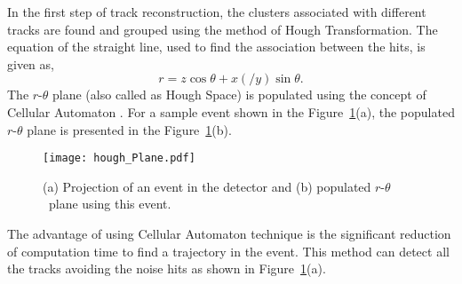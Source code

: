 In the first step of track reconstruction, the clusters associated
with different tracks are found and grouped using the method of Hough
Transformation\cite{hought1,hought}. The equation of the straight line,
used to find the association between the hits, is given as,
\begin{equation}
  r=z\cos\theta+x\left(/y\right)\sin\theta. \label{eq:hough}
\end{equation}
The \mbox{$r$-$\theta$} plane (also called as Hough Space) is
populated using the concept of Cellular Automaton \cite{cellular}.
For a sample event shown in the Figure~\ref{fig:houghPl}(a),
the populated \mbox{$r$-$\theta$} plane is presented in the
Figure~\ref{fig:houghPl}(b).
\begin{figure}[h]
  \texttt{[image: hough\_Plane.pdf]} 
  \caption{(a) Projection of an event in the detector and
    (b) populated $r$-$\theta$~plane using this event.}
  \label{fig:houghPl}
\end{figure}
The advantage of using Cellular Automaton technique is the significant
reduction of computation time to find a trajectory in the event.
This method can detect all the tracks avoiding the noise hits as
shown in Figure~\ref{fig:houghPl}(a).

